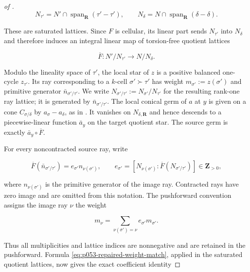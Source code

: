 \begin{proof}[of
]
\[
 N_{\tau'}=N'\cap\operatorname{span}_{\mathbf R}(\tau'-\tau'),
 \qquad
 N_\delta=N\cap\operatorname{span}_{\mathbf R}(\delta-\delta).
\]

These are saturated lattices.  Since \(F\) is cellular, its linear part
sends \(N_{\tau'}\) into \(N_\delta\) and therefore induces an integral
linear map of torsion-free quotient lattices

\begin{equation}
 \overline F:N'/N_{\tau'}\longrightarrow N/N_\delta.
 \label{eq:p053-vthree-quotient-map}
\end{equation}

Modulo the lineality space of \(\tau'\), the local star of \(z\) is a
positive balanced one-cycle \(z_{\tau'}\).  Its ray corresponding to a
\(k\)-cell \(\sigma'\succ\tau'\) has weight
\(m_{\sigma'}:=z(\sigma')\) and primitive generator
\(\bar n_{\sigma'/\tau'}\).  We write
\(N_{\sigma'/\tau'}:=N_{\sigma'}/N_{\tau'}\) for the resulting
rank-one ray lattice; it is generated by
\(\bar n_{\sigma'/\tau'}\).  The local conical germ of \(a\) at \(y\) is
given on a cone \(C_{\sigma/\delta}\) by \(a_\sigma-a_\delta\), as in
\cite[Definition~2.30]{BMPS26}.  It vanishes on \(N_{\delta,\mathbf R}\)
and hence descends to a piecewise-linear function \(\bar a_y\) on the
target quotient star.  The source germ is exactly
\(\bar a_y\circ\overline F\).

For every noncontracted source ray, write

\begin{equation}
 \overline F(\bar n_{\sigma'/\tau'})
 =e_{\sigma'}n_{\nu(\sigma')},
 \qquad
 e_{\sigma'}
 =[N_{\nu(\sigma')}:
   \overline F(N_{\sigma'/\tau'})]\in\mathbf Z_{>0},
 \label{eq:p053-vthree-ray-index}
\end{equation}

where \(n_{\nu(\sigma')}\) is the primitive generator of the image ray.
Contracted rays have zero image and are omitted from this notation.  The
pushforward convention \cite[(1.4.3)]{GK17} assigns the image ray \(\nu\)
the weight

\begin{equation}
 m_\nu
 =\sum_{\nu(\sigma')=\nu}e_{\sigma'}m_{\sigma'}.
 \label{eq:p053-vthree-pushforward-weight}
\end{equation}

Thus all multiplicities and lattice indices are nonnegative and are retained
in the pushforward.  Formula \eqref{eq:p053-repaired-weight-match}, applied
in the saturated quotient lattices, now gives the exact coefficient identity


\end{proof}
